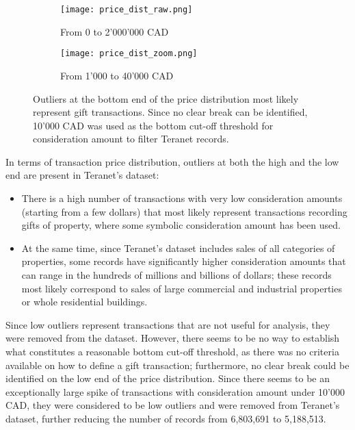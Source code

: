 \begin{figure}[ht]
    \centering
    \begin{subfigure}{\linewidth}
        \centering
        \texttt{[image: price\_dist\_raw.png]}
        \caption{From 0 to 2'000'000 CAD}
    \end{subfigure}

    \begin{subfigure}{\linewidth}
        \centering
        \texttt{[image: price\_dist\_zoom.png]}
        \caption{From 1'000 to 40'000 CAD}
    \end{subfigure}
    \caption{Outliers at the bottom end of the price distribution most likely represent gift transactions.
    Since no clear break can be identified, 10'000 CAD was used as the bottom cut-off threshold for consideration amount to filter Teranet records.}
    \label{fig:bottom_outliers}
\end{figure}

In terms of transaction price distribution, outliers at both the high and the low end are present in Teranet's dataset:
\begin{itemize}
    \item There is a high number of transactions with very low consideration amounts (starting from a few dollars) that most likely represent transactions recording gifts of property, where some symbolic consideration amount has been used.
    \item At the same time, since Teranet's dataset includes sales of all categories of properties, some records have significantly higher consideration amounts that can range in the hundreds of millions and billions of dollars;
    these records most likely correspond to sales of large commercial and industrial properties or whole residential buildings.
\end{itemize}

Since low outliers represent transactions that are not useful for analysis, they were removed from the dataset.
However, there seems to be no way to establish what constitutes a reasonable bottom cut-off threshold, as there was no criteria available on how to define a gift transaction;
furthermore, no clear break could be identified on the low end of the price distribution.
Since there seems to be an exceptionally large spike of transactions with consideration amount under 10'000 CAD, they were considered to be low outliers and were removed from Teranet's dataset, further reducing the number of records from 6,803,691 to 5,188,513.

